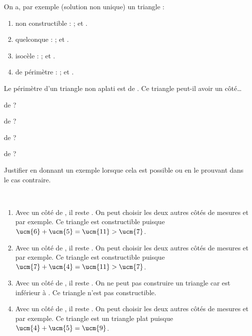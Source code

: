 \begin{colonne*exercice}
\begin{corrige}
   On a, par exemple (solution non unique) un triangle :
   \begin{enumerate}
      \item non constructible : {\blue {} ;  et }.
      \item quelconque : {\blue {} ;  et }.
      \item isocèle : {\blue {} ;  et }.
      \item de périmètre  : {\blue {} ;  et }.
   \end{enumerate}
\end{corrige}

\bigskip


\begin{exercice} %
   Le périmètre d'un triangle non aplati est de . Ce triangle peut-il avoir un côté\dots
   \begin{colenumerate}{2}
      \item de  ?
      \item de  ?
      \item de  ?
      \item de  ?
   \end{colenumerate}
   Justifier en donnant un exemple lorsque cela est possible ou en le prouvant dans le cas contraire.
\end{exercice}

\begin{corrige}
   \ \\ [-5mm]
   \begin{enumerate}
      \item Avec un côté de , il reste . On peut choisir les deux autres côtés de mesures  et  par exemple. {\blue Ce triangle est  constructible} puisque $\ucm{6}+\ucm{5} =\ucm{11} >\ucm{7}$. \smallskip
      \item Avec un côté de , il reste . On peut choisir les deux autres côtés de mesures  et  par exemple. {\blue Ce triangle est constructible} puisque $\ucm{7}+\ucm{4} =\ucm{11} >\ucm{7}$. \smallskip
      \item Avec un côté de , il reste . On ne peut pas construire un triangle car  est inférieur à . {\blue Ce triangle n'est pas constructible}. \smallskip
      \item Avec un côté de , il reste . On peut choisir les deux autres côtés de mesures  et  par exemple. {\blue Ce triangle est un triangle plat} puisque $\ucm{4}+\ucm{5} =\ucm{9}$.
   \end{enumerate}
\end{corrige}


\end{colonne*exercice}
